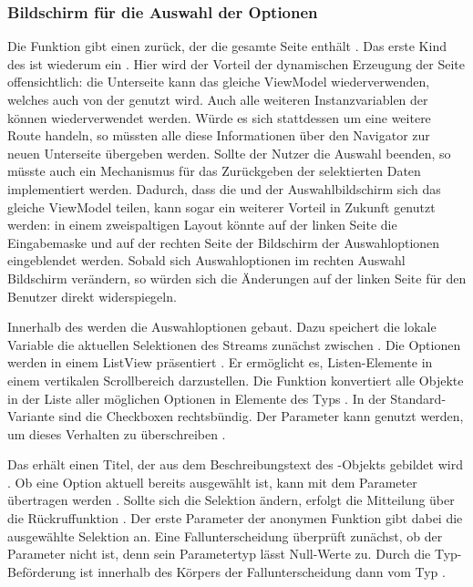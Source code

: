 \subsubsection{Bildschirm für die Auswahl der Optionen}

 
Die Funktion  \Lst{\ref{lst:Schritt1FunktionCreateMultipleChoiceSelectionScreen}} gibt einen  zurück, der die gesamte Seite enthält .
Das erste Kind des  ist wiederum ein  .
Hier wird der Vorteil der dynamischen Erzeugung der Seite offensichtlich: die Unterseite kann das gleiche ViewModel wiederverwenden, welches auch von der  genutzt wird.  Auch alle weiteren Instanzvariablen der  können wiederverwendet werden. Würde es sich stattdessen um eine weitere Route handeln, so müssten alle diese Informationen über den Navigator zur neuen Unterseite übergeben werden. Sollte der Nutzer die Auswahl beenden, so müsste auch ein Mechanismus für das Zurückgeben der selektierten Daten implementiert werden.
Dadurch, dass die  und der Auswahlbildschirm sich das gleiche ViewModel teilen, kann sogar ein weiterer Vorteil in Zukunft genutzt werden: in einem zweispaltigen Layout könnte auf der linken Seite die Eingabemaske und auf der rechten Seite der Bildschirm der Auswahloptionen eingeblendet werden.
Sobald sich Auswahloptionen im rechten Auswahl Bildschirm verändern, so würden sich die Änderungen auf der linken Seite für den Benutzer direkt widerspiegeln.

Innerhalb des  werden die Auswahloptionen gebaut.
Dazu speichert die lokale Variable  die aktuellen Selektionen des Streams zunächst zwischen .
Die Optionen werden in einem ListView präsentiert .
Er ermöglicht es, Listen-Elemente in einem vertikalen Scrollbereich darzustellen.
Die Funktion  konvertiert alle Objekte in der Liste aller möglichen Optionen  in Elemente des Typs  .
In der Standard-Variante sind die Checkboxen rechtsbündig.
Der Parameter  kann genutzt werden, um dieses Verhalten zu überschreiben . 

Das  erhält einen Titel, der aus dem Beschreibungstext  des -Objekts gebildet wird .
Ob eine Option aktuell bereits ausgewählt ist, kann mit dem Parameter  übertragen werden .
Sollte sich die Selektion ändern, erfolgt die Mitteilung über die Rückruffunktion  .
Der erste Parameter der anonymen Funktion gibt dabei die ausgewählte Selektion an.
Eine Fallunterscheidung überprüft zunächst, ob der Parameter  nicht  ist, denn sein Parametertyp  lässt Null-Werte zu.
Durch die Typ-Beförderung ist  innerhalb des Körpers der Fallunterscheidung dann vom Typ  . 



